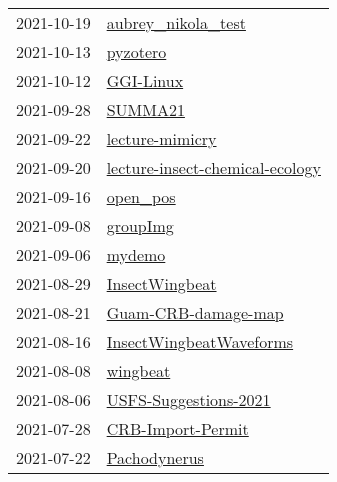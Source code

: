 \begin{longtable}{ll}
2021-10-19 &                                     \href{https://github.com/aubreymoore/aubrey_nikola_test}{aubrey_nikola_test} \\
2021-10-13 &                                                         \href{https://github.com/aubreymoore/pyzotero}{pyzotero} \\
2021-10-12 &                                                       \href{https://github.com/aubreymoore/GGI-Linux}{GGI-Linux} \\
2021-09-28 &                                                           \href{https://github.com/aubreymoore/SUMMA21}{SUMMA21} \\
2021-09-22 &                                           \href{https://github.com/aubreymoore/lecture-mimicry}{lecture-mimicry} \\
2021-09-20 &           \href{https://github.com/aubreymoore/lecture-insect-chemical-ecology}{lecture-insect-chemical-ecology} \\
2021-09-16 &                                                         \href{https://github.com/aubreymoore/open_pos}{open_pos} \\
2021-09-08 &                                                         \href{https://github.com/aubreymoore/groupImg}{groupImg} \\
2021-09-06 &                                                             \href{https://github.com/aubreymoore/mydemo}{mydemo} \\
2021-08-29 &                                             \href{https://github.com/aubreymoore/InsectWingbeat}{InsectWingbeat} \\
2021-08-21 &                                   \href{https://github.com/aubreymoore/Guam-CRB-damage-map}{Guam-CRB-damage-map} \\
2021-08-16 &                           \href{https://github.com/aubreymoore/InsectWingbeatWaveforms}{InsectWingbeatWaveforms} \\
2021-08-08 &                                                         \href{https://github.com/aubreymoore/wingbeat}{wingbeat} \\
2021-08-06 &                               \href{https://github.com/aubreymoore/USFS-Suggestions-2021}{USFS-Suggestions-2021} \\
2021-07-28 &                                       \href{https://github.com/aubreymoore/CRB-Import-Permit}{CRB-Import-Permit} \\
2021-07-22 &                                                 \href{https://github.com/aubreymoore/Pachodynerus}{Pachodynerus} \\

\end{longtable}

